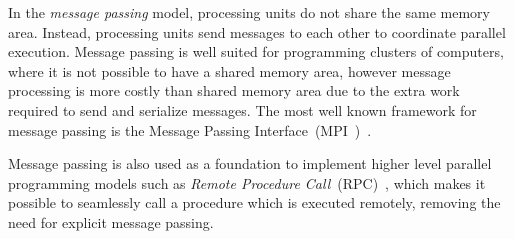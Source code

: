 In the \emph{message passing} model, processing units do not share the same
memory area. Instead, processing units send messages to each other to coordinate
parallel execution. Message passing is well suited for programming clusters of
computers, where it is not possible to have a shared memory area, however
message processing is more costly than shared memory area due to the extra work
required to send and serialize messages.  The most well known framework for
message passing is the Message Passing Interface~(MPI~)~\cite{Forum:1994}.

Message passing is also used as a foundation to implement higher level parallel
programming models such as \emph{Remote Procedure
Call}~(RPC)~\cite{Birrell:1984}, which makes it possible to seamlessly call a
procedure which is executed remotely, removing the need for explicit message
passing.

